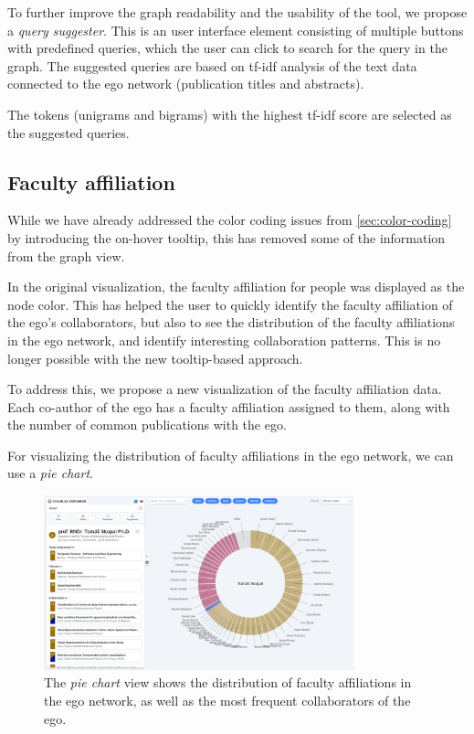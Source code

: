 To further improve the graph readability and the usability of the tool, we propose a \textit{query suggester}. 
This is an user interface element consisting of multiple buttons with predefined queries, which the user can click to search for the query in the graph.
The suggested queries are based on tf-idf analysis of the text data connected to the ego network (publication titles and abstracts). 

The tokens (unigrams and bigrams) with the highest tf-idf score are selected as the suggested queries.

\subsection{Faculty affiliation}

While we have already addressed the color coding issues from \ref{sec:color-coding} by introducing the on-hover tooltip, 
this has removed some of the information from the graph view.

In the original visualization, the faculty affiliation for people was displayed as the node color.
This has helped the user to quickly identify the faculty affiliation of the ego's collaborators, 
but also to see the distribution of the  faculty affiliations in the ego network, 
and identify interesting collaboration patterns. 
This is no longer possible with the new tooltip-based approach.

To address this, we propose a new visualization of the faculty affiliation data.
Each co-author of the ego has a faculty affiliation assigned to them, along with the number of common publications with the ego.

For visualizing the distribution of faculty affiliations in the ego network, we can use a \textit{pie chart}.

\begin{figure}[ht!]
    \captionsetup{width=.9\linewidth}
    \includegraphics[width=0.8\textwidth]{../img/pie-chart.png}
    \centering
    \caption{The \textit{pie chart} view shows the distribution of faculty affiliations in the ego network, as well as the most frequent collaborators of the ego.}
\end{figure}


